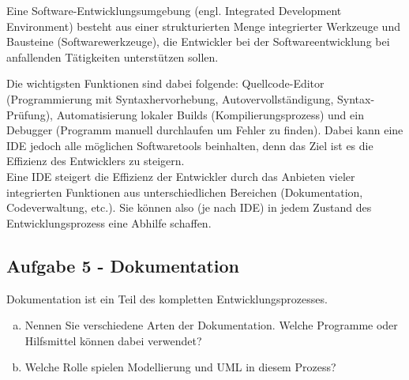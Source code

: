        \begin{loesung}\:
            \begin{highlighting}[IDE]
                Eine Software-Entwicklungsumgebung (engl. Integrated Development Environment) besteht aus einer strukturierten Menge integrierter Werkzeuge und Bausteine (Softwarewerkzeuge), die Entwickler bei der Softwareentwicklung bei anfallenden Tätigkeiten unterstützen sollen.
            \end{highlighting}
            Die wichtigsten Funktionen sind dabei folgende: Quellcode-Editor (Programmierung mit Syntaxhervorhebung, Autovervollständigung, Syntax-Prüfung), Automatisierung lokaler Builds (Kompilierungsprozess) und ein Debugger (Programm manuell durchlaufen um Fehler zu finden). Dabei kann eine IDE jedoch alle möglichen Softwaretools beinhalten, denn das Ziel ist es die Effizienz des Entwicklers zu steigern.\\[.3cm]
            Eine IDE steigert die Effizienz der Entwickler durch das Anbieten vieler integrierten Funktionen aus unterschiedlichen Bereichen (Dokumentation, Codeverwaltung, etc.). Sie können also (je nach IDE) in jedem Zustand des Entwicklungsprozess eine Abhilfe schaffen.
        \end{loesung}
	
    
	\subsection{Aufgabe 5 - Dokumentation}
    
        \begin{aufgabe}
            Dokumentation ist ein Teil des kompletten Entwicklungsprozesses.
            \\[-.7cm]\begin{enumerate}[(a)]
                \setlength\itemsep{0.1px}
                \item Nennen Sie verschiedene Arten der Dokumentation. Welche Programme oder Hilfsmittel können dabei verwendet?
                \item Welche Rolle spielen Modellierung und UML in diesem Prozess?
            \end{enumerate}
        \end{aufgabe}
    
